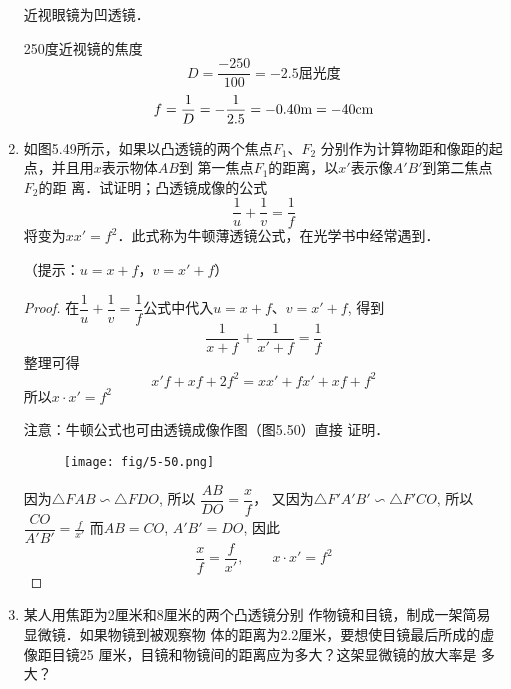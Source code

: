 \begin{enumerate}
\begin{solution}
    近视眼镜为凹透镜．
    
    250度近视镜的焦度
\[D=\frac{-250}{100}=-2.5\text{屈光度}\]
\[f=\frac{1}{D}=-\frac{1}{2.5}=-0.40{\rm m}=-40{\rm cm}\]
\end{solution}
\item 如图5.49所示，如果以凸透镜的两个焦点$F_1$、$F_2$
分别作为计算物距和像距的起点，并且用$x$表示物体$AB$到
第一焦点$F_1$的距离，以$x'$表示像$A'B'$到第二焦点$F_2$的距
离．试证明；凸透镜成像的公式
\[\frac{1}{u}+\frac{1}{v}=\frac{1}{f} \]
将变为$xx'=f^2$．此式称为牛顿薄透镜公式，在光学书中经常遇到．
\begin{figure}[htp]
	\centering
{}
	\caption{}
\end{figure}
（提示：$u=x+f$，$v=x'+f$）

\begin{proof}
在$\dfrac{1}{u}+\dfrac{1}{v}=\dfrac{1}{f}$公式中代入$u=x+f$、$v=x'+f$, 
得到
\[\frac{1}{x+f}+\frac{1}{x'+f}=\frac{1}{f}\]    
整理可得
\[x'f+xf+2f^2=xx'+fx'+xf+f^2\]
所以$x\cdot x'=f^2$

注意：牛顿公式也可由透镜成像作图（图5.50）直接
证明．
\begin{figure}[htp]
    \centering
    \texttt{[image: fig/5-50.png]}
    \caption{}
\end{figure}

因为$\triangle FAB\backsim \triangle FDO$, 所以
$\dfrac{AB}{DO}=\dfrac{x}{f}$，
又因为$\triangle F'A'B'\backsim \triangle F'CO$, 所以$\dfrac{CO}{A'B'}=\frac{f}{x'}$
而$AB=CO$, $A'B'=DO$, 因此
\[\frac{x}{f}=\frac{f}{x'},\qquad x\cdot x'=f^2\]
\end{proof}
\item 某人用焦距为2厘米和8厘米的两个凸透镜分别
作物镜和目镜，制成一架简易显微镜．如果物镜到被观察物
体的距离为2.2厘米，要想使目镜最后所成的虚像距目镜25
厘米，目镜和物镜间的距离应为多大？这架显微镜的放大率是
多大？


\end{enumerate}
